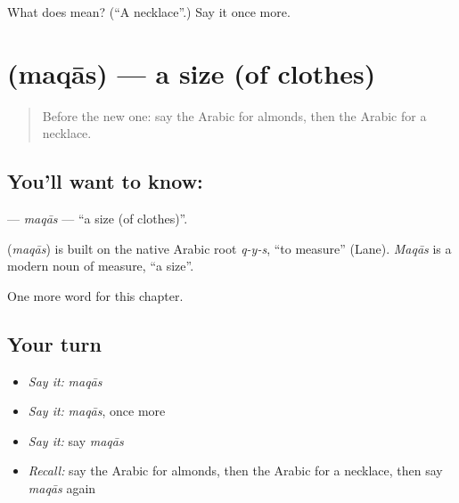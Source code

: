 \begin{tcolorbox}[breakable,colback=teal!4,colframe=teal!35!black,title={Before you move on}]
What does  mean? (\textquotedblleft{}A necklace\textquotedblright{}.) Say it once more.
\end{tcolorbox}
\section[\texorpdfstring{\ar{مقاس} (maqās)}{مقاس (maqās)}]{ (maqās) — a size (of clothes)}

\label{lesson:AR-C245-maqas}



\begin{quote}
Before the new one: say the Arabic for almonds, then the Arabic for a necklace.
\end{quote}

\subsection*{You'll want to know: }
\textbf{} — \emph{maqās} — \textquotedblleft{}a size (of clothes)\textquotedblright{}.

\begin{cousinweb}
\textbf{} (\emph{maqās}) is built on the native Arabic root \emph{q-y-s}, \textquotedblleft{}to measure\textquotedblright{} (Lane). \emph{Maqās} is a modern noun of measure, \textquotedblleft{}a size\textquotedblright{}.
\end{cousinweb}

\begin{grammarlens}[title={What you've built}]
One more word for this chapter.
\end{grammarlens}

\subsection*{Your turn}
\begin{itemize}
\raggedright
  \item \emph{Say it:} \emph{maqās}
  \item \emph{Say it:} \emph{maqās}, once more
  \item \emph{Say it:} say \emph{maqās}
  \item \emph{Recall:} say the Arabic for almonds, then the Arabic for a necklace, then say \emph{maqās} again
\end{itemize}

